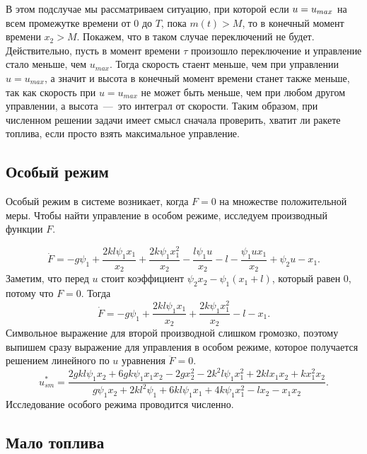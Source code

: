 \documentclass[12pt, a4paper]{article} %
\newcommand*{\hm}[1]{#1\nobreak\discretionary{}%
            {\hbox{\mathsurround=0pt #1}}{}}
\begin{document}
В этом подслучае мы рассматриваем ситуацию, при которой если $u \hm= u_{max}$ 
на всем промежутке времени от $0$ до  $T$, пока $m(t) > M$,
то в конечный момент времени $x_2 > M$.
Покажем, что в таком случае переключений не будет.
Действительно, пусть в момент времени $\tau$ произошло переключение 
и управление стало меньше, чем $u_{max}$.
Тогда скорость стаент меньше, чем при управлении  $u = u_{max}$, а 
значит и высота в конечный момент времени станет также меньше, 
так как скорость при $u=u_{max}$ не может быть меньше, чем при любом другом управлении, а высота~---~это интеграл от скорости. 
Таким образом, при численном решении задачи имеет смысл сначала проверить,
хватит ли ракете топлива, если просто взять максимальное управление.

\subsection{Особый режим}

Особый режим в системе возникает, когда $F = 0$ на множестве положительной меры.
Чтобы найти управление в особом режиме, исследуем производный функции  $F$.

\[
    \dot F = - g \psi_{1} + \frac{2 k l \psi_{1} x_{1}}{x_{2}} + \frac{2 k \psi_{1} x_{1}^{2}}{x_{2}} - \frac{l \psi_{1} u}{x_{2}} - l - \frac{\psi_{1} u x_{1}}{x_{2}} + \psi_{2} u - x_{1}
.\] 
Заметим, что перед $u$ стоит коэффициент  $\psi_2x_2 - \psi_1(x_1 + l)$,
который равен $0$, потому что  $F = 0$.
Тогда 
 \[
    \dot F = - g \psi_{1} + \frac{2 k l \psi_{1} x_{1}}{x_{2}} + \frac{2 k \psi_{1} x_{1}^{2}}{x_{2}} - l - x_{1}
.\] 
Символьное выражение для второй производной слишком громозко, 
поэтому выпишем сразу выражение для управления в особом режиме, 
которое получается решением линейного по $u$ уравнения $\ddot F = 0$.
 \[
     u^*_{sm} = \frac{2 g k l \psi_{1} x_{2} + 6 g k \psi_{1} x_{1} x_{2} - 2 g x_{2}^{2} - 2 k^{2} l \psi_{1} x_{1}^{2} + 2 k l x_{1} x_{2} + k x_{1}^{2} x_{2}}{g \psi_{1} x_{2} + 2 k l^{2} \psi_{1} + 6 k l \psi_{1} x_{1} + 4 k \psi_{1} x_{1}^{2} - l x_{2} - x_{1} x_{2}}
 .\] 
Исследование особого режима проводится численно.

\subsection{Мало топлива}
\end{document}
